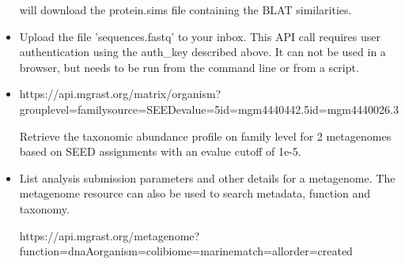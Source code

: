 \documentclass[letterpaper,10pt,english]{sphinxmanual}
\begin{document}
\begin{itemize}
will download the protein.sims file containing the BLAT similarities.

\item {} 

\begin{sphinxVerbatim}[commandchars=\\\{\}]
       
\end{sphinxVerbatim}

Upload the file ’sequences.fastq’ to your inbox. This API call
requires user authentication using the auth\_key described above. It
can not be used in a browser, but needs to be run from the command
line or from a script.

\item {} 

\begin{sphinxVerbatim}[commandchars=\\\{\}]
https://api.mg\PYGZhy{}rast.org/matrix/organism?group\PYGZus{}level=family\PYGZam{}source=SEED\PYGZam{}evalue=5\PYGZam{}id=mgm4440442.5\PYGZam{}id=mgm4440026.3
\end{sphinxVerbatim}

Retrieve the taxonomic abundance profile on family level for 2
metagenomes based on SEED assignments with an evalue cutoff of 1e-5.

\item {} 

\begin{sphinxVerbatim}[commandchars=\\\{\}]
\end{sphinxVerbatim}

List analysis submission parameters and other details for a
metagenome. The metagenome resource can also be used to search
metadata, function and taxonomy.

\begin{sphinxVerbatim}[commandchars=\\\{\}]
https://api.mg\PYGZhy{}rast.org/metagenome?function=dnaA\PYGZam{}organism=coli\PYGZam{}biome=marine\PYGZam{}match=all\PYGZam{}order=created
\end{sphinxVerbatim}


\end{itemize}
\end{document}
